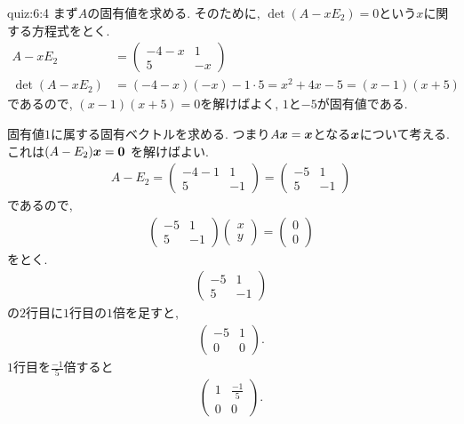 \begin{answerof}{quiz:6:4}
  まず$A$の固有値を求める.
  そのために, $\det(A-xE_2)=0$という$x$に関する方程式をとく.
  \begin{align*}
    A-xE_2&=\begin{pmatrix}-4-x&1\\5&-x\end{pmatrix}\\
    \det(A-xE_2)&=(-4-x)(-x)-1\cdot 5=x^2+4x-5=(x-1)(x+5)
  \end{align*}
  であるので, $(x-1)(x+5)=0$を解けばよく,
  $1$と$-5$が固有値である.

  固有値$1$に属する固有ベクトルを求める.
  つまり$A\boldsymbol{x}=\boldsymbol{x}$となる$\boldsymbol{x}$について考える.
  これは$(A-E_2)\boldsymbol{x}=\boldsymbol{0}$
  を解けばよい.
  \begin{align*}
    A-E_2=\begin{pmatrix}-4-1&1\\5&-1\end{pmatrix}
    =\begin{pmatrix}-5&1\\5&-1\end{pmatrix}
  \end{align*}
  であるので,
  \begin{align*}
    \begin{pmatrix}-5&1\\5&-1\end{pmatrix}
    \begin{pmatrix}x\\y\end{pmatrix}=
    \begin{pmatrix}0\\0\end{pmatrix}
  \end{align*}
  をとく.
  \begin{align*}
    \begin{pmatrix}-5&1\\5&-1\end{pmatrix}
  \end{align*}
  の$2$行目に$1$行目の$1$倍を足すと,
 \begin{align*}
    \begin{pmatrix}-5&1\\0&0\end{pmatrix}.
  \end{align*}
 $1$行目を$\frac{-1}{5}$倍すると
 \begin{align*}
    \begin{pmatrix}1&\frac{-1}{5}\\0&0\end{pmatrix}.

\end{align*}
\end{answerof}
